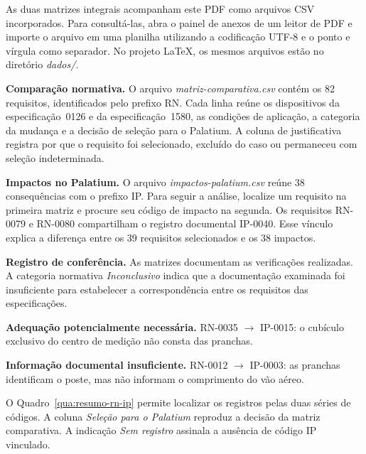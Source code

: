 \label{ap:matrizes}

As duas matrizes integrais acompanham este PDF como arquivos CSV incorporados. Para consultá-las, abra o painel de anexos de um leitor de PDF e importe o arquivo em uma planilha utilizando a codificação UTF-8 e o ponto e vírgula como separador. No projeto LaTeX, os mesmos arquivos estão no diretório \emph{dados/}.

\textbf{Comparação normativa.} O arquivo \emph{matriz-comparativa.csv} contém os 82 requisitos, identificados pelo prefixo RN. Cada linha reúne os dispositivos da especificação~0126 e da especificação~1580, as condições de aplicação, a categoria da mudança e a decisão de seleção para o Palatium. A coluna de justificativa registra por que o requisito foi selecionado, excluído do caso ou permaneceu com seleção indeterminada.

\textbf{Impactos no Palatium.} O arquivo \emph{impactos-palatium.csv} reúne 38 consequências com o prefixo IP. Para seguir a análise, localize um requisito na primeira matriz e procure seu código de impacto na segunda. Os requisitos RN-0079 e RN-0080 compartilham o registro documental IP-0040. Esse vínculo explica a diferença entre os 39 requisitos selecionados e os 38 impactos.

\textbf{Registro de conferência.} As matrizes documentam as verificações realizadas. A categoria normativa \emph{Inconclusivo} indica que a documentação examinada foi insuficiente para estabelecer a correspondência entre os requisitos das especificações.

\textbf{Adequação potencialmente necessária.} RN-0035 $\rightarrow$ IP-0015: o cubículo exclusivo do centro de medição não consta das pranchas.

\textbf{Informação documental insuficiente.} RN-0012 $\rightarrow$ IP-0003: as pranchas identificam o poste, mas não informam o comprimento do vão aéreo.


O Quadro~\ref{qua:resumo-rn-ip} permite localizar os registros pelas duas séries de códigos. A coluna \emph{Seleção para o Palatium} reproduz a decisão da matriz comparativa. A indicação \emph{Sem registro} assinala a ausência de código IP vinculado.

